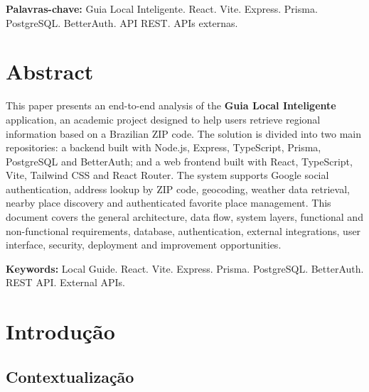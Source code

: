 \documentclass[
    12pt,
    oneside,
    openright,
    a4paper,
    english,
    brazil
]{abntex2}
\begin{document}
\vspace{0.5cm}

\textbf{Palavras-chave:} Guia Local Inteligente. React. Vite. Express. Prisma. PostgreSQL. BetterAuth. API REST. APIs externas.


\chapter*{Abstract}

This paper presents an end-to-end analysis of the \textbf{Guia Local Inteligente} application, an academic project designed to help users retrieve regional information based on a Brazilian ZIP code. The solution is divided into two main repositories: a backend built with Node.js, Express, TypeScript, Prisma, PostgreSQL and BetterAuth; and a web frontend built with React, TypeScript, Vite, Tailwind CSS and React Router. The system supports Google social authentication, address lookup by ZIP code, geocoding, weather data retrieval, nearby place discovery and authenticated favorite place management. This document covers the general architecture, data flow, system layers, functional and non-functional requirements, database, authentication, external integrations, user interface, security, deployment and improvement opportunities.

\vspace{0.5cm}

\textbf{Keywords:} Local Guide. React. Vite. Express. Prisma. PostgreSQL. BetterAuth. REST API. External APIs.


\tableofcontents*
\clearpage


\chapter{Introdução}

\section{Contextualização}
\end{document}
